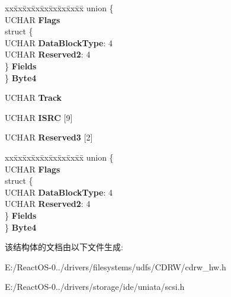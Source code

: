 \begin{DoxyCompactItemize}
\begin{tabbing}
xx\=xx\=xx\=xx\=xx\=xx\=xx\=xx\=xx\=\kill
union \{\\
\>UCHAR {\bfseries Flags}\\
\>struct \{\\
\>\>UCHAR {\bfseries DataBlockType}: 4\\
\>\>UCHAR {\bfseries Reserved2}: 4\\
\>\} {\bfseries Fields}\\
\} {\bfseries Byte4}\\

\end{tabbing}\item 
\mbox{\label{struct___m_o_d_e___p_h_i_l_i_p_s___s_e_c_t_o_r___t_y_p_e___p_a_g_e_a1453764736af941518a55fda8ca45dca}} 
U\+C\+H\+AR {\bfseries Track}
\item 
\mbox{\label{struct___m_o_d_e___p_h_i_l_i_p_s___s_e_c_t_o_r___t_y_p_e___p_a_g_e_a816020cb726e48a1021b79f479adcccf}} 
U\+C\+H\+AR {\bfseries I\+S\+RC} \mbox{[}9\mbox{]}
\item 
\mbox{\label{struct___m_o_d_e___p_h_i_l_i_p_s___s_e_c_t_o_r___t_y_p_e___p_a_g_e_a99a20de41bedec409972e40e562e55da}} 
U\+C\+H\+AR {\bfseries Reserved3} \mbox{[}2\mbox{]}
\item 
\mbox{\label{struct___m_o_d_e___p_h_i_l_i_p_s___s_e_c_t_o_r___t_y_p_e___p_a_g_e_a46c1c3aed0fc8610de24b57ef75bdbd8}} 
\begin{tabbing}
xx\=xx\=xx\=xx\=xx\=xx\=xx\=xx\=xx\=\kill
union \{\\
\>UCHAR {\bfseries Flags}\\
\>struct \{\\
\>\>UCHAR {\bfseries DataBlockType}: 4\\
\>\>UCHAR {\bfseries Reserved2}: 4\\
\>\} {\bfseries Fields}\\
\} {\bfseries Byte4}\\

\end{tabbing}\end{DoxyCompactItemize}


该结构体的文档由以下文件生成\+:\begin{DoxyCompactItemize}
\item 
E\+:/\+React\+O\+S-\/0../drivers/filesystems/udfs/\+C\+D\+R\+W/cdrw\+\_\+hw.\+h\item 
E\+:/\+React\+O\+S-\/0../drivers/storage/ide/uniata/scsi.\+h\end{DoxyCompactItemize}
